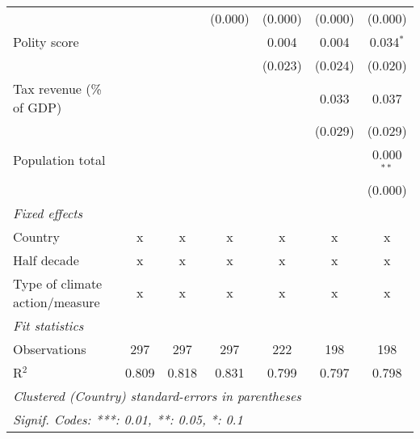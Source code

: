 \begin{tabular}{lcccccc}
                                                                                &         &                & (0.000)        & (0.000)        & (0.000)        & (0.000)\\   
   Polity score                                                                 &         &                &                & 0.004          & 0.004          & 0.034$^{*}$\\   
                                                                                &         &                &                & (0.023)        & (0.024)        & (0.020)\\   
   Tax revenue (\% of GDP)                                                      &         &                &                &                & 0.033          & 0.037\\   
                                                                                &         &                &                &                & (0.029)        & (0.029)\\   
   Population total                                                             &         &                &                &                &                & 0.000$^{**}$\\   
                                                                                &         &                &                &                &                & (0.000)\\   
   \emph{Fixed effects}\\
   Country                                                                      & x       & x              & x              & x              & x              & x\\  
   Half decade                                                                  & x       & x              & x              & x              & x              & x\\  
   Type of climate action/measure                                               & x       & x              & x              & x              & x              & x\\  
   \midrule \emph{Fit statistics}\\
   Observations                                                                 & 297     & 297            & 297            & 222            & 198            & 198\\  
   R$^2$                                                                        & 0.809   & 0.818          & 0.831          & 0.799          & 0.797          & 0.798\\  
   \midrule
   \multicolumn{7}{l}{\emph{Clustered (Country) standard-errors in parentheses}}\\
   \multicolumn{7}{l}{\emph{Signif. Codes: ***: 0.01, **: 0.05, *: 0.1}}\\
\end{tabular}
\par\endgroup



